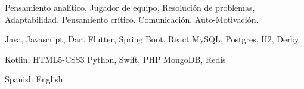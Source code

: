 
\begin{cvparagraph}
Pensamiento analítico, Jugador de equipo, Resolución de problemas, Adaptabilidad, Pensamiento crítico, Comunicación, Auto-Motivación.
\end{cvparagraph}

\begin{multicols}{3}
  \begin{cvskills}
    \cvskill
      {Java, Javascript, Dart} %
      {\faStar\faStar\faStar\faStar\faStarHalfEmpty} %
    \cvskill
      {Flutter, Spring Boot, React} %
      {\faStar\faStar\faStar\faStar\faStarHalfEmpty} %
    \cvskill
      {MySQL, Postgres, H2, Derby} %
      {\faStar\faStar\faStar\faStar\faStarHalfEmpty} %
  \end{cvskills}

  \columnbreak

  \begin{cvskills}
    \cvskill
      {Kotlin, HTML5-CSS3} %
      {\faStar\faStar\faStar\faStarHalfEmpty\faStarO} %
    \cvskill
      {{\hphantom{Empty}} Python, Swift, PHP} %
      {\faStar\faStar\faStar\faStarHalfEmpty\faStarO} %
    \cvskill
      {MongoDB, Redis} %
      {\faStar\faStar\faStar\faStarHalfEmpty\faStarO} %
  \end{cvskills}

  \columnbreak

  \begin{cvskills}
    \cvskill
      {Spanish} %
      {\faStar\faStar\faStar\faStar\faStar} %
    \cvskill
      {English} %
      {\faStar\faStar\faStar\faStarHalfEmpty\faStarO} %
  \end{cvskills}
\end{multicols}
